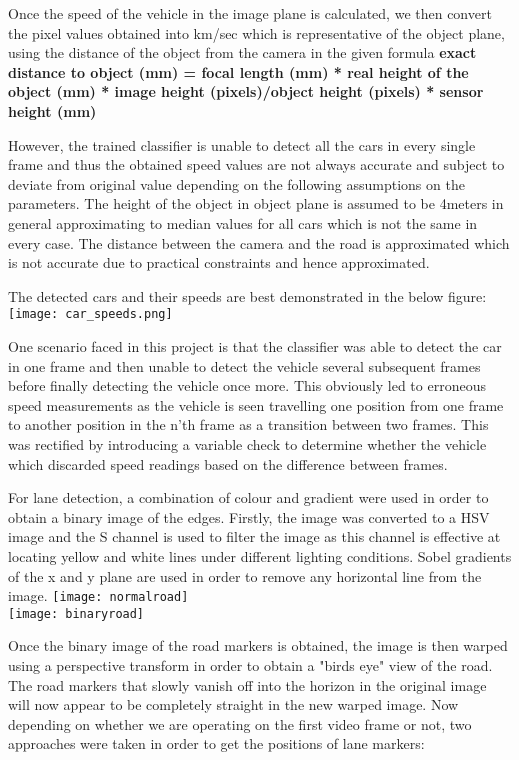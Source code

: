 \documentclass[conference]{IEEEtran}
\begin{document}
Once the speed of the vehicle in the image plane is calculated, we then convert the pixel values obtained into km/sec which is representative of the object plane, using the distance of the object from the camera in the given formula \textbf{exact distance to object (mm) = focal length (mm) * real height of the object (mm) * image height (pixels)/object height (pixels) * sensor height (mm)} 

However, the trained classifier is unable to detect all the cars in every single frame and thus the obtained speed values are not always accurate and subject to deviate from original value depending on the following assumptions on the parameters. The height of the object in object plane is assumed to be 4meters in general approximating to median values for all cars which is not the same in every case. The distance between the camera and the road is approximated which is not accurate due to practical constraints and hence approximated. 

The detected cars and their speeds are best demonstrated in the below figure:
\texttt{[image: car\_speeds.png]}

One scenario faced in this project is that the classifier was able to detect the car in one frame and then unable to detect the vehicle several subsequent frames before finally detecting the vehicle once more. This obviously led to erroneous speed measurements as the vehicle is seen travelling one position from one frame to another position in the n'th frame as a transition between two frames. This was rectified by introducing a variable check to determine whether the vehicle which discarded speed readings based on the difference between frames.

For lane detection, a combination of colour and gradient were used in order to obtain a binary image of the edges. Firstly, the image was converted to a HSV image and the S channel is used to filter the image as this channel is effective at locating yellow and white lines under different lighting conditions. Sobel gradients of the x and y plane are used in order to remove any horizontal line from the image.
\texttt{[image: normalroad]}
\\
\texttt{[image: binaryroad]}

Once the binary image of the road markers is obtained, the image is then warped using a perspective transform in order to obtain a "birds eye" view of the road. The road markers that slowly vanish off into the horizon in the original image will now appear to be completely straight in the new warped image. Now depending on whether we are operating on the first video frame or not, two approaches were taken in order to get the positions of lane markers:
\end{document}
